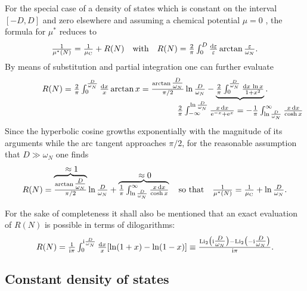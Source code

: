 For the special case of a density of states which is constant on the interval
$[-D, D]$ and zero elsewhere and assuming a chemical potential $\mu = 0$
\cite[39]{AllenMitrovic82}, the formula for $\mu^*$ reduces to
%
\begin{equation*}
    \frac 1 {\mu^*(N)} = \frac 1 {\mu \sub C} + R(N)
    \quad \text{with} \quad
    R(N) = \frac 2 \pi \int_0^D \frac {\D \epsilon} \epsilon
    \arctan \frac \epsilon {\omega_N}.
\end{equation*}
%
By means of substitution and partial integration one can further evaluate
%
\begin{equation*}
    R(N) = \frac 2 \pi \int_0^{\frac D {\omega_N}} \frac {\D x} x \arctan x
    = \frac{\arctan \tfrac D {\omega_N}}{\pi / 2} \ln \frac D {\omega_N}
    - \hypo
        {\frac 2 \pi \int_0^{\frac D {\omega_N}} \frac{\D x \, \ln x}{1 + x^2}}
        { \frac 2 \pi \int_{-\infty}^{\ln \frac D {\omega_N}}
        \frac{x \, \D x}{\E^{-x} + \E^x}
        = -\frac 1 \pi \int_{\ln \frac D {\omega_N}}^\infty
        \frac{x \, \D x}{\cosh x} }.
\end{equation*}
%
Since the hyperbolic cosine growths exponentially with the magnitude of its
arguments while the arc tangent approaches $\pi / 2$, for the reasonable
assumption that $D \gg \omega_N$ one finds
%
\begin{equation} \label{rectangular-DOS mu*}
R(N) = \hyper{\frac{\arctan \tfrac D {\omega_N}}{\pi / 2}}{\approx 1}
\ln \frac D {\omega_N}
+ \hyper{
    \frac 1 \pi \int_{\ln \frac D {\omega_N}}^\infty
    \frac{x \, \D x}{\cosh x}
    }
    {\approx 0}
\quad \text{so that} \quad
\frac 1 {\mu^*(N)} = \frac 1 {\mu \sub C} + \ln \frac D {\omega_N}.
\end{equation}

For the sake of completeness it shall also be mentioned that an exact evaluation
of $R(N)$ is possible in terms of dilogarithms:
%
\begin{equation*}
    R(N) = \frac 1 {\I \pi} \int_0^{\I \frac D {\omega_N}} \frac {\D x} x
    [\ln(1 + x) - \ln(1 - x)]
    \equiv \frac
        { \mathrm{Li}_2 \big(  \I \tfrac D {\omega_N} \big)
        - \mathrm{Li}_2 \big( -\I \tfrac D {\omega_N} \big) }
        {\I \pi}.
\end{equation*}

\subsection{Constant density of states}

